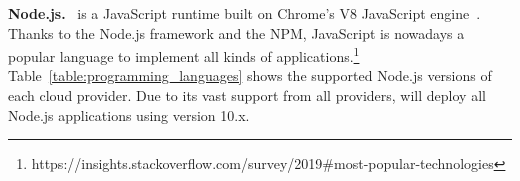 \textbf{Node.js.}~\cite{tilkov2010node} is a JavaScript runtime built on Chrome's V8 JavaScript engine~\cite{Nodejs}. 
Thanks to the Node.js framework and the \gls{NPM}, JavaScript is nowadays a popular language to implement all kinds of applications.\footnote{https://insights.stackoverflow.com/survey/2019\#most-popular-technologies} %
Table~\ref{table:programming_languages} shows the supported Node.js versions of each cloud provider. 
Due to its vast support from all providers, \sys will deploy all Node.js applications using version 10.x. 
